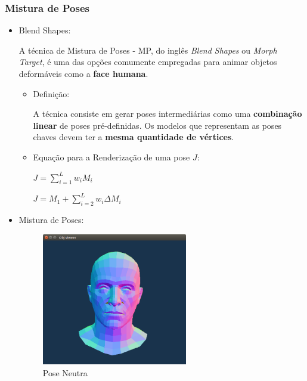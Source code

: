 \documentclass[brazil]{beamer}
\begin{document}
\begin{frame}
\frametitle{Mistura de Poses}
  \begin{itemize}
  	
  	\item Blend Shapes:
  	
  	A técnica de Mistura de Poses - MP, do inglês \textit{Blend Shapes} ou \textit{Morph Target}, é uma das opções comumente empregadas para animar objetos deformáveis como a \textbf{face humana}.
  	
 	 	\begin{itemize}
  	
 	 	\item Definição:
  	
 	 	A técnica consiste em gerar poses intermediárias como uma \textbf{combinação linear} de poses pré-definidas. Os modelos que representam as poses chaves devem ter a \textbf{mesma quantidade de vértices}.
  	
  	
  	    \item Equação para a Renderização de uma pose $J$:
      
   		   $J = \sum_{i=1}^L  w_i M_i$
      
   		   $J = M_1 + \sum_{i = 2}^L w_i \Delta M_i $

  \end{itemize} 

  \end{itemize} 
\end{frame}
\begin{frame}
  \begin{itemize}
  \item Mistura de Poses:
  \begin{figure}
\centering
\includegraphics[width = 0.6\textwidth, keepaspectratio]{./img/rosto-neutro.png}
        \caption{Pose Neutra}
     \end{figure}         
  \end{itemize} 
\end{frame}
\end{document}
